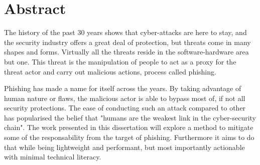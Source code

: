\chapter*{Abstract}

The history of the past 30 years shows that cyber-attacks are here to stay, and the security industry offers a great deal of protection, but threats come in many shapes and forms. Virtually all the threats reside in the software-hardware area but one. This threat is the manipulation of people to act as a proxy for the threat actor and carry out malicious actions, process called phishing.

Phishing has made a name for itself across the years. By taking advantage of human nature or flaws, the malicious actor is able to bypass most of, if not all security protections. The ease of conducting such an attack compared to other has popularised the belief that "humans are the weakest link in the cyber-security chain". The work presented in this dissertation will explore a method to mitigate some of the responsability from the target of phishing. Furthermore it aims to do that while being lightweight and performant, but most importantly actionable with minimal technical literacy.





